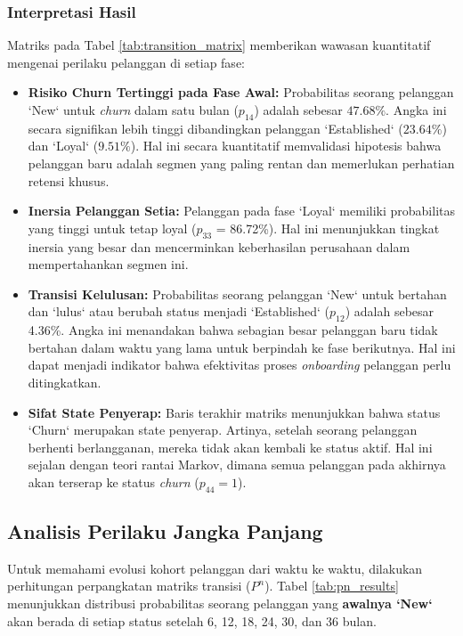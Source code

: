 \documentclass[a4paper,12pt]{article}
\begin{document}
\subsubsection{Interpretasi Hasil}
Matriks pada Tabel \ref{tab:transition_matrix} memberikan wawasan kuantitatif mengenai perilaku pelanggan di setiap fase:
\begin{itemize}
    \item \textbf{Risiko Churn Tertinggi pada Fase Awal:} Probabilitas seorang pelanggan `New` untuk \textit{churn} dalam satu bulan ($p_{14}$) adalah sebesar $47.68\%$. Angka ini secara signifikan lebih tinggi dibandingkan pelanggan `Established` ($23.64\%$) dan `Loyal` ($9.51\%$). Hal ini secara kuantitatif memvalidasi hipotesis bahwa pelanggan baru adalah segmen yang paling rentan dan memerlukan perhatian retensi khusus.
    \item \textbf{Inersia Pelanggan Setia:} Pelanggan pada fase `Loyal` memiliki probabilitas yang tinggi untuk tetap loyal ($p_{33}$ = 86.72\%). Hal ini menunjukkan tingkat inersia yang besar dan mencerminkan keberhasilan perusahaan dalam mempertahankan segmen ini.
    \item \textbf{Transisi Kelulusan:} Probabilitas seorang pelanggan `New` untuk bertahan dan `lulus` atau berubah status menjadi `Established` ($p_{12}$) adalah sebesar 4.36\%. Angka ini menandakan bahwa sebagian besar pelanggan baru tidak bertahan dalam waktu yang lama untuk berpindah ke fase berikutnya. Hal ini dapat menjadi indikator bahwa efektivitas proses \textit{onboarding} pelanggan perlu ditingkatkan.
    \item \textbf{Sifat State Penyerap:} Baris terakhir matriks menunjukkan bahwa status `Churn` merupakan state penyerap. Artinya, setelah seorang pelanggan berhenti berlangganan, mereka tidak akan kembali ke status aktif. Hal ini sejalan dengan teori rantai Markov, dimana semua pelanggan pada akhirnya akan terserap ke status \textit{churn} ($p_{44}=1$). 
\end{itemize}
    
\subsection{Analisis Perilaku Jangka Panjang}
Untuk memahami evolusi kohort pelanggan dari waktu ke waktu, dilakukan perhitungan perpangkatan matriks transisi ($P^n$). Tabel \ref{tab:pn_results} menunjukkan distribusi probabilitas seorang pelanggan yang \textbf{awalnya `New`} akan berada di setiap status setelah 6, 12, 18, 24, 30, dan 36 bulan.
\end{document}
